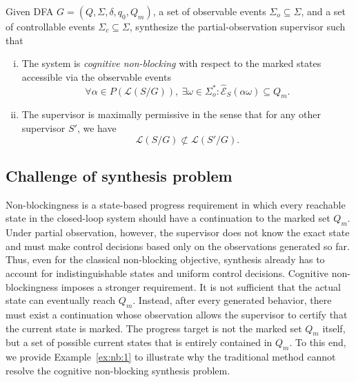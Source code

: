\documentclass[journal,twoside,web]{ieeecolor}
\begin{document}
%
\begin{problem}\label{prob:cnb}
    Given DFA $G = (Q, \Sigma, \delta, q_0, Q_m)$, a set of observable events $\Sigma_o \subseteq \Sigma$, and a set of controllable events $\Sigma_c \subseteq \Sigma$, synthesize the partial-observation supervisor such that
    \begin{enumerate}[(i)]
        \item The system is \textit{cognitive non-blocking} with respect to the marked states accessible via the observable events
        \begin{equation}
        \forall \alpha \in P(\mathcal{L}(S/G)),\
        \exists \omega \in \Sigma_o^* :        \hat{\mathcal{E}}_S(\alpha\omega)\subseteq Q_m.
        \end{equation}
        \item The supervisor is maximally permissive in the sense that for any other supervisor $S'$, we have
        $$
            \mathcal{L}(S/G) \not \subset \mathcal{L}(S'/G).
        $$
    \end{enumerate}
\end{problem}

\subsection{Challenge of synthesis problem}


Non-blockingness is a state-based progress requirement in which every reachable state in the closed-loop system should have a continuation to the marked set $Q_m$.
Under partial observation, however, the supervisor does not know the exact state and must make control decisions based only on the observations generated so far.
Thus, even for the classical non-blocking objective, synthesis already has to account for indistinguishable states and uniform control decisions.
%
Cognitive non-blockingness imposes a stronger requirement.
It is not sufficient that the actual state can eventually reach $Q_m$.
Instead, after every generated behavior, there must exist a continuation whose observation allows the supervisor to certify that the current state is marked.
The progress target is not the marked set $Q_m$ itself, but a set of possible current states that is entirely contained in $Q_m$.
To this end, we provide Example~\ref{ex:nb:1} to illustrate why the traditional method cannot resolve the cognitive non-blocking synthesis problem.
\end{document}
